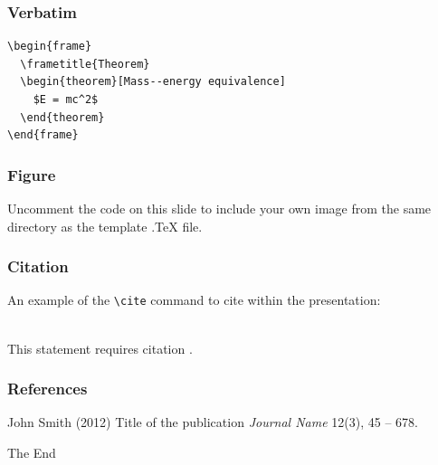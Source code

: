 \documentclass{beamer}
\begin{document}

\begin{frame}[fragile] %
  \frametitle{Verbatim}
  \begin{example}
\begin{verbatim}
\begin{frame}
  \frametitle{Theorem}
  \begin{theorem}[Mass--energy equivalence]
    $E = mc^2$
  \end{theorem}
\end{frame}\end{verbatim}
\end{example}
\end{frame}


\begin{frame}
  \frametitle{Figure}
  Uncomment the code on this slide to include your own image from the same directory as the template .TeX file.
\end{frame}


\begin{frame}[fragile] %
  \frametitle{Citation}
  An example of the \verb|\cite| command to cite within the presentation:\\~

  This statement requires citation \cite{p1}.
\end{frame}


\begin{frame}
  \frametitle{References}
  \footnotesize{
    \begin{thebibliography}{99} %
     John Smith (2012)
      \newblock Title of the publication
      \newblock \emph{Journal Name} 12(3), 45 -- 678.
    \end{thebibliography}
  }
\end{frame}


\begin{frame}
  \Huge{\centerline{The End}}
\end{frame}

\end{document}
